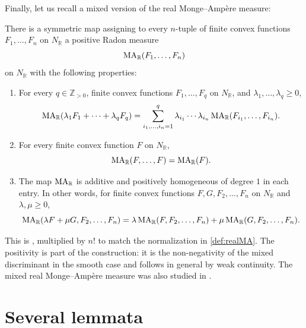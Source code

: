 Finally, let us recall a mixed version of the real Monge--Ampère measure:
\begin{theorem}\label{thm:mixed_realMA}
    There is a symmetric map assigning to every $n$-tuple of finite convex functions $F_1,\ldots,F_n$ on $N_{\mathbb R}$ a positive Radon measure
    \[
        \operatorname{MA}_{\mathbb R}(F_1,\ldots,F_n)
    \]
    on $N_{\mathbb R}$ with the following properties:
    \begin{enumerate}
        \item\label{itm:thm:mixed_realMA:1} For every $q\in \mathbb Z_{>0}$, finite convex functions $F_1,\ldots,F_q$ on $N_{\mathbb R}$, and $\lambda_1,\ldots,\lambda_q\geq 0$,
        \[
            \operatorname{MA}_{\mathbb R}(\lambda_1F_1+\cdots+\lambda_qF_q)
            =\sum_{i_1,\ldots,i_n=1}^q
            \lambda_{i_1}\cdots\lambda_{i_n}
            \operatorname{MA}_{\mathbb R}(F_{i_1},\ldots,F_{i_n}).
        \]
        \item\label{itm:thm:mixed_realMA:2} For every finite convex function $F$ on $N_{\mathbb R}$,
        \[
            \operatorname{MA}_{\mathbb R}(F,\ldots,F)=\operatorname{MA}_{\mathbb R}(F).
        \]
        \item\label{itm:thm:mixed_realMA:3} The map $\operatorname{MA}_{\mathbb R}$ is additive and positively homogeneous of degree $1$ in each entry. In other words, for finite convex functions $F,G,F_2,\ldots,F_n$ on $N_{\mathbb R}$ and $\lambda,\mu\geq 0$,
        \[
            \operatorname{MA}_{\mathbb R}(\lambda F+\mu G,F_2,\ldots,F_n)
            =\lambda\operatorname{MA}_{\mathbb R}(F,F_2,\ldots,F_n)
            +\mu\operatorname{MA}_{\mathbb R}(G,F_2,\ldots,F_n).
        \]
    \end{enumerate}
\end{theorem}
This is \cite[Theorem~4.3(a),(b),(f)]{CLM22}, multiplied by $n!$ to match the normalization in \cref{def:realMA}. The positivity is part of the construction: it is the non-negativity of the mixed discriminant in the smooth case and follows in general by weak continuity. The mixed real Monge--Ampère measure was also studied in \cite{TW02,PR04}.

\section{Several lemmata}
\label{sec:convex_sep}

